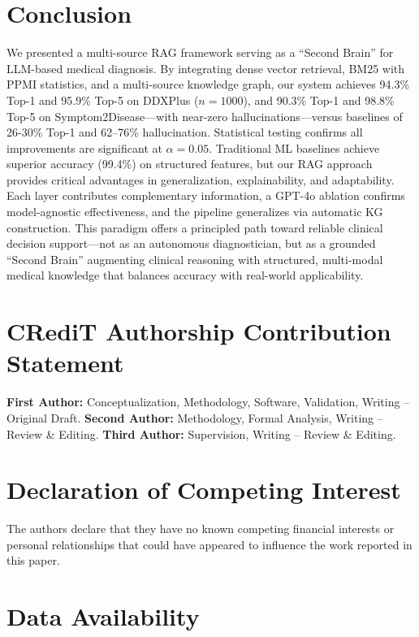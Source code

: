 \documentclass[preprint,12pt]{elsarticle}
\begin{document}
\section{Conclusion}
\label{sec:conclusion}

We presented a multi-source RAG framework serving as a ``Second Brain'' for LLM-based medical diagnosis. By integrating dense vector retrieval, BM25 with PPMI statistics, and a multi-source knowledge graph, our system achieves 94.3\% Top-1 and 95.9\% Top-5 on DDXPlus ($n{=}1000$), and 90.3\% Top-1 and 98.8\% Top-5 on Symptom2Disease---with near-zero hallucinations---versus baselines of 26-30\% Top-1 and 62--76\% hallucination. Statistical testing confirms all improvements are significant at $\alpha=0.05$. Traditional ML baselines achieve superior accuracy (99.4\%) on structured features, but our RAG approach provides critical advantages in generalization, explainability, and adaptability. Each layer contributes complementary information, a GPT-4o ablation confirms model-agnostic effectiveness, and the pipeline generalizes via automatic KG construction. This paradigm offers a principled path toward reliable clinical decision support---not as an autonomous diagnostician, but as a grounded ``Second Brain'' augmenting clinical reasoning with structured, multi-modal medical knowledge that balances accuracy with real-world applicability.

\section*{CRediT Authorship Contribution Statement}

\textbf{First Author:} Conceptualization, Methodology, Software, Validation, Writing -- Original Draft.
\textbf{Second Author:} Methodology, Formal Analysis, Writing -- Review \& Editing.
\textbf{Third Author:} Supervision, Writing -- Review \& Editing.

\section*{Declaration of Competing Interest}

The authors declare that they have no known competing financial interests or personal relationships that could have appeared to influence the work reported in this paper.

\section*{Data Availability}
\end{document}
